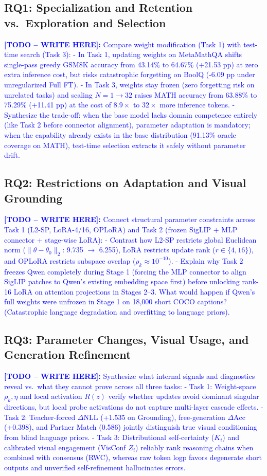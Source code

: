 \documentclass{article}
\newcommand{\writetodo}[1]{\noindent\textcolor{blue}{\textbf{[TODO -- WRITE HERE]:} #1}\par\medskip}
\begin{document}
\subsection{RQ1: Specialization and Retention vs.\ Exploration and Selection}
\writetodo{Compare weight modification (Task 1) with test-time search (Task 3):
- In Task 1, updating weights on MetaMathQA shifts single-pass greedy GSM8K accuracy from 43.14\% to 64.67\% (+21.53 pp) at zero extra inference cost, but risks catastrophic forgetting on BoolQ (-6.09 pp under unregularized Full FT).
- In Task 3, weights stay frozen (zero forgetting risk on unrelated tasks) and scaling $N=1 \rightarrow 32$ raises MATH accuracy from 63.88\% to 75.29\% (+11.41 pp) at the cost of $8.9\times$ to $32\times$ more inference tokens.
- Synthesize the trade-off: when the base model lacks domain competence entirely (like Task 2 before connector alignment), parameter adaptation is mandatory; when the capability already exists in the base distribution (91.13\% oracle coverage on MATH), test-time selection extracts it safely without parameter drift.}

\subsection{RQ2: Restrictions on Adaptation and Visual Grounding}
\writetodo{Connect structural parameter constraints across Task 1 (L2-SP, LoRA-4/16, OPLoRA) and Task 2 (frozen SigLIP + MLP connector + stage-wise LoRA):
- Contrast how L2-SP restricts global Euclidean norm ($\|\theta-\theta_0\|_2$: 9.735 $\rightarrow$ 6.255), LoRA restricts update rank ($r \in \{4,16\}$), and OPLoRA restricts subspace overlap ($\rho_k \approx 10^{-10}$).
- Explain why Task 2 freezes Qwen completely during Stage 1 (forcing the MLP connector to align SigLIP patches to Qwen's existing embedding space first) before unlocking rank-16 LoRA on attention projections in Stages 2--3. What would happen if Qwen's full weights were unfrozen in Stage 1 on 18,000 short COCO captions? (Catastrophic language degradation and overfitting to language priors).}

\subsection{RQ3: Parameter Changes, Visual Usage, and Generation Refinement}
\writetodo{Synthesize what internal signals and diagnostics reveal vs.\ what they cannot prove across all three tasks:
- Task 1: Weight-space $\rho_k, \eta$ and local activation $R(z)$ verify whether updates avoid dominant singular directions, but local probe activations do not capture multi-layer cascade effects.
- Task 2: Teacher-forced $\Delta\text{NLL}$ (+1.535 on Grounding), free-generation $\Delta\text{Acc}$ (+0.398), and Partner Match (0.586) jointly distinguish true visual conditioning from blind language priors.
- Task 3: Distributional self-certainty ($K_i$) and calibrated visual engagement (VisConf $Z_i$) reliably rank reasoning chains when combined with consensus (RWC), whereas raw token logp favors degenerate short outputs and unverified self-refinement hallucinates errors.}
\end{document}
